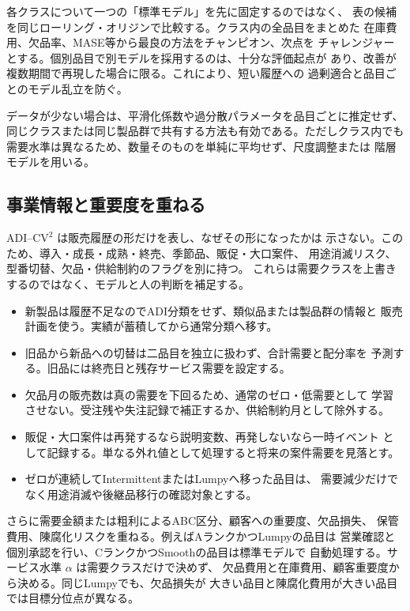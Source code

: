 \documentclass[a4paper,11pt]{jsarticle}
\begin{document}
各クラスについて一つの「標準モデル」を先に固定するのではなく、
表の候補を同じローリング・オリジンで比較する。クラス内の全品目をまとめた
在庫費用、欠品率、MASE等から最良の方法をチャンピオン、次点を
チャレンジャーとする。個別品目で別モデルを採用するのは、十分な評価起点が
あり、改善が複数期間で再現した場合に限る。これにより、短い履歴への
過剰適合と品目ごとのモデル乱立を防ぐ。

データが少ない場合は、平滑化係数や過分散パラメータを品目ごとに推定せず、
同じクラスまたは同じ製品群で共有する方法も有効である。ただしクラス内でも
需要水準は異なるため、数量そのものを単純に平均せず、尺度調整または
階層モデルを用いる。

\subsection{事業情報と重要度を重ねる}

ADI--$\mathrm{CV}^2$ は販売履歴の形だけを表し、なぜその形になったかは
示さない。このため、導入・成長・成熟・終売、季節品、販促・大口案件、
用途消滅リスク、型番切替、欠品・供給制約のフラグを別に持つ。
これらは需要クラスを上書きするのではなく、モデルと人の判断を補足する。
\begin{itemize}
\item 新製品は履歴不足なのでADI分類をせず、類似品または製品群の情報と
販売計画を使う。実績が蓄積してから通常分類へ移す。
\item 旧品から新品への切替は二品目を独立に扱わず、合計需要と配分率を
予測する。旧品には終売日と残存サービス需要を設定する。
\item 欠品月の販売数は真の需要を下回るため、通常のゼロ・低需要として
学習させない。受注残や失注記録で補正するか、供給制約月として除外する。
\item 販促・大口案件は再発するなら説明変数、再発しないなら一時イベント
として記録する。単なる外れ値として処理すると将来の案件需要を見落とす。
\item ゼロが連続してIntermittentまたはLumpyへ移った品目は、
需要減少だけでなく用途消滅や後継品移行の確認対象とする。
\end{itemize}

さらに需要金額または粗利によるABC区分、顧客への重要度、欠品損失、
保管費用、陳腐化リスクを重ねる。例えばAランクかつLumpyの品目は
営業確認と個別承認を行い、CランクかつSmoothの品目は標準モデルで
自動処理する。サービス水準 $\alpha$ は需要クラスだけで決めず、
欠品費用と在庫費用、顧客重要度から決める。同じLumpyでも、欠品損失が
大きい品目と陳腐化費用が大きい品目では目標分位点が異なる。
\end{document}
